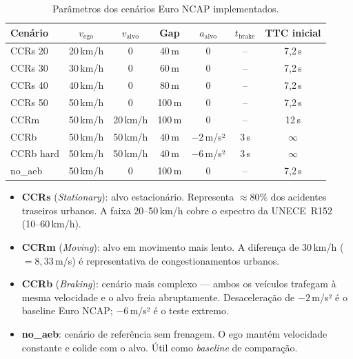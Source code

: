 \documentclass[12pt,a4paper]{article}
\begin{document}
\begin{table}[H]
  \centering
  \caption{Parâmetros dos cenários Euro NCAP implementados.}
  \begin{tabular}{lcccccc}
    \toprule
    \rowcolor{azulescuro!90}
    \color{white}\textbf{Cenário} &
    \color{white}\textbf{$v_\text{ego}$} &
    \color{white}\textbf{$v_\text{alvo}$} &
    \color{white}\textbf{Gap} &
    \color{white}\textbf{$a_\text{alvo}$} &
    \color{white}\textbf{$t_\text{brake}$} &
    \color{white}\textbf{TTC inicial} \\
    \midrule
    CCRs 20 & 20\,km/h & 0       & 40\,m  & 0              & --   & 7,2\,s \\
    \rowcolor{azulclaro!50}
    CCRs 30 & 30\,km/h & 0       & 60\,m  & 0              & --   & 7,2\,s \\
    CCRs 40 & 40\,km/h & 0       & 80\,m  & 0              & --   & 7,2\,s \\
    \rowcolor{azulclaro!50}
    CCRs 50 & 50\,km/h & 0       & 100\,m & 0              & --   & 7,2\,s \\
    CCRm    & 50\,km/h & 20\,km/h& 100\,m & 0              & --   & 12\,s  \\
    \rowcolor{azulclaro!50}
    CCRb    & 50\,km/h & 50\,km/h& 40\,m  & $-2$\,m/s²    & 3\,s & $\infty$\\
    CCRb hard& 50\,km/h& 50\,km/h& 40\,m  & $-6$\,m/s²    & 3\,s & $\infty$\\
    \rowcolor{azulclaro!50}
    no\_aeb & 50\,km/h & 0       & 100\,m & 0              & --   & 7,2\,s \\
    \bottomrule
  \end{tabular}
\end{table}

\begin{itemize}
  \item \textbf{CCRs} (\emph{Stationary}): alvo estacionário. Representa $\approx 80$\%
        dos acidentes traseiros urbanos. A faixa 20--50\,km/h cobre o espectro da
        UNECE~R152 (10--60\,km/h).

  \item \textbf{CCRm} (\emph{Moving}): alvo em movimento mais lento. A diferença de
        30\,km/h ($= 8{,}33$\,m/s) é representativa de congestionamentos urbanos.

  \item \textbf{CCRb} (\emph{Braking}): cenário mais complexo --- ambos os veículos
        trafegam à mesma velocidade e o alvo freia abruptamente. Desaceleração de
        $-2$\,m/s² é o baseline Euro NCAP; $-6$\,m/s² é o teste extremo.

  \item \textbf{no\_aeb}: cenário de referência sem frenagem. O ego mantém velocidade
        constante e colide com o alvo. Útil como \emph{baseline} de comparação.
\end{itemize}
\end{document}
